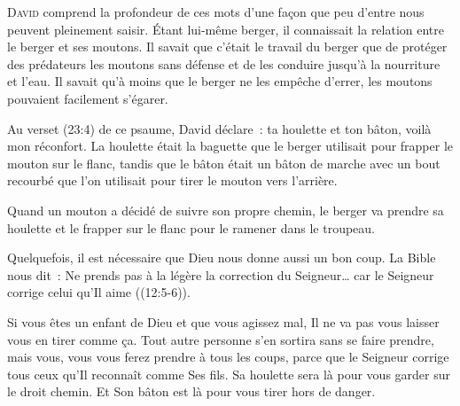 

\lettrine{D}{avid} comprend la profondeur de ces mots
 d'une fa\c{c}on que peu d'entre nous peuvent pleinement saisir.
 Étant lui-même berger, il connaissait la relation entre le berger
 et ses moutons.
 Il savait que c'était le travail du berger que de protéger
 des prédateurs les moutons sans défense et de les conduire
 jusqu'à la nourriture et l'eau.
 Il savait qu'à moins que le berger ne les empêche d'errer,
 les moutons pouvaient facilement s'égarer.

Au verset (23:4) de ce psaume, David déclare~:
 \Og ta houlette et ton bâton, voilà mon réconfort. \Fg{}
 La houlette était la baguette que le berger utilisait
 pour frapper le mouton sur le flanc, tandis que le bâton
 était un bâton de marche avec un bout recourbé
 que l'on utilisait pour tirer le mouton vers l'arrière.


Quand un mouton a décidé de suivre son propre chemin,
 le berger va prendre sa houlette et le frapper
 sur le flanc pour le ramener dans le troupeau.

Quelquefois, il est nécessaire que Dieu nous donne aussi un bon coup.
 La Bible nous dit~:
 \Og Ne prends pas à la légère la correction du Seigneur\dots{}
 car le Seigneur corrige celui qu'Il aime \Fg{} ((12:5-6)).

Si vous êtes un enfant de Dieu et que vous agissez mal,
 Il ne va pas vous laisser vous en tirer comme \c{c}a.
 Tout autre personne s'en sortira sans se faire prendre, mais vous,
 vous vous ferez prendre à tous les coups, parce que le Seigneur
 corrige tous ceux qu'Il reconnaît comme Ses fils.
 Sa houlette sera là pour vous garder sur le droit chemin.
 Et Son bâton est là pour vous tirer hors de danger. 

\dvrule






